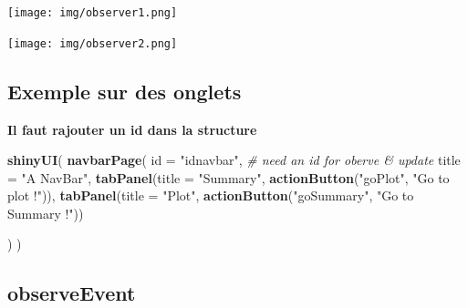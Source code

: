 \documentclass[
]{article}
\newenvironment{Shaded}{\begin{snugshade}}{\end{snugshade}}
\newcommand{\AttributeTok}[1]{\textcolor[rgb]{0.13,0.29,0.53}{#1}}
\newcommand{\CommentTok}[1]{\textcolor[rgb]{0.56,0.35,0.01}{\textit{#1}}}
\newcommand{\ControlFlowTok}[1]{\textcolor[rgb]{0.13,0.29,0.53}{\textbf{#1}}}
\newcommand{\FunctionTok}[1]{\textcolor[rgb]{0.13,0.29,0.53}{\textbf{#1}}}
\newcommand{\NormalTok}[1]{#1}
\newcommand{\SpecialCharTok}[1]{\textcolor[rgb]{0.81,0.36,0.00}{\textbf{#1}}}
\newcommand{\StringTok}[1]{\textcolor[rgb]{0.31,0.60,0.02}{#1}}
\begin{document}
\texttt{[image: img/observer1.png]}

\texttt{[image: img/observer2.png]}

\hypertarget{exemple-sur-des-onglets}{%
\subsection{Exemple sur des onglets}\label{exemple-sur-des-onglets}}

\textbf{Il faut rajouter un id dans la structure}

\begin{Shaded}
\begin{Highlighting}[]
\FunctionTok{shinyUI}\NormalTok{(}
  \FunctionTok{navbarPage}\NormalTok{(}
    \AttributeTok{id =} \StringTok{"idnavbar"}\NormalTok{, }\CommentTok{\# need an id for oberve \& update}
    \AttributeTok{title =} \StringTok{"A NavBar"}\NormalTok{,}
    \FunctionTok{tabPanel}\NormalTok{(}\AttributeTok{title =} \StringTok{"Summary"}\NormalTok{,}
             \FunctionTok{actionButton}\NormalTok{(}\StringTok{"goPlot"}\NormalTok{, }\StringTok{"Go to plot !"}\NormalTok{)),}
    \FunctionTok{tabPanel}\NormalTok{(}\AttributeTok{title =} \StringTok{"Plot"}\NormalTok{,}
             \FunctionTok{actionButton}\NormalTok{(}\StringTok{"goSummary"}\NormalTok{, }\StringTok{"Go to Summary !"}\NormalTok{))}
    
\NormalTok{  )}
\NormalTok{)}
\end{Highlighting}
\end{Shaded}

\begin{Shaded}
\end{Shaded}

\hypertarget{observeevent}{%
\subsection{observeEvent}\label{observeevent}}
\end{document}
